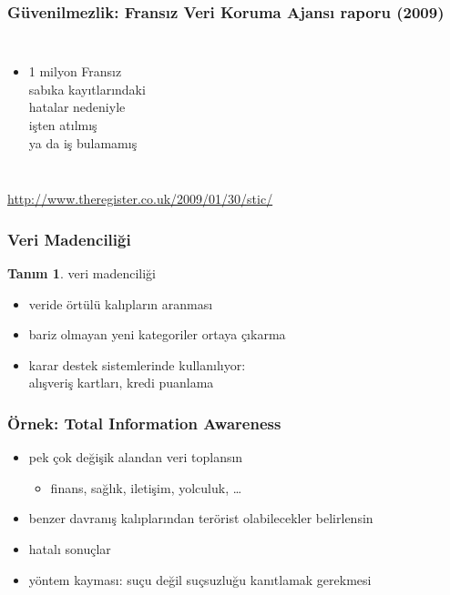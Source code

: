 \documentclass[dvipsnames]{beamer}
\theoremstyle{definition}
\newtheorem{tanim}[theorem]{Tanım}
\theoremstyle{example}
\theoremstyle{plain}
\begin{document}
\begin{frame}
  \frametitle{Güvenilmezlik: Fransız Veri Koruma Ajansı raporu (2009)}

  \begin{columns}

    \begin{itemize}
      \item 1 milyon Fransız\\
        sabıka kayıtlarındaki\\
        hatalar nedeniyle\\
        işten atılmış\\
        ya da iş bulamamış
    \end{itemize}
  \end{columns}

  \medskip
  \tiny{\url{http://www.theregister.co.uk/2009/01/30/stic/}}
\end{frame}

\begin{frame}
  \frametitle{Veri Madenciliği}

  \begin{tanim}
    \alert{veri madenciliği}

    \begin{itemize}
      \item veride örtülü kalıpların aranması
      \item bariz olmayan yeni kategoriler ortaya çıkarma
    \end{itemize}
  \end{tanim}

  \pause
  \begin{itemize}
    \item karar destek sistemlerinde kullanılıyor:\\
      alışveriş kartları, kredi puanlama
  \end{itemize}
\end{frame}

\begin{frame}
  \frametitle{Örnek: Total Information Awareness}

  \begin{itemize}
    \item pek çok değişik alandan veri toplansın
    \begin{itemize}
      \item finans, sağlık, iletişim, yolculuk, \ldots
    \end{itemize}
    \item benzer davranış kalıplarından terörist olabilecekler belirlensin

    \pause
    \bigskip
    \item hatalı sonuçlar
    \item yöntem kayması: suçu değil suçsuzluğu kanıtlamak gerekmesi
  \end{itemize}
\end{frame}
\end{document}
